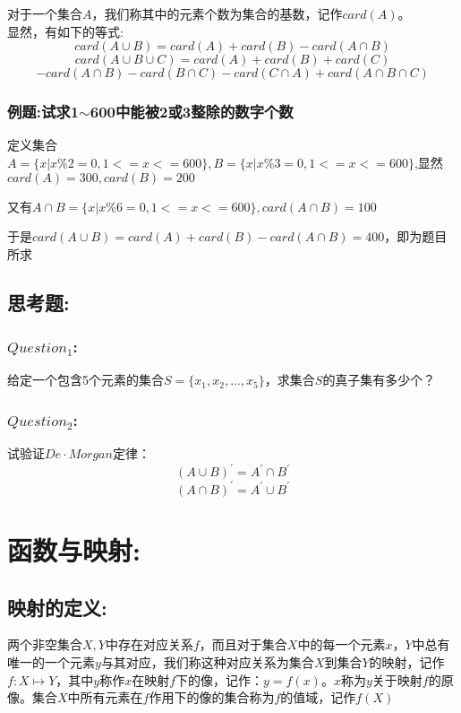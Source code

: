 \documentclass[UTF8]{article}
\begin{document}
对于一个集合$A$，我们称其中的元素个数为集合的基数，记作$card(A)$。\\

显然，有如下的等式:
$$card(A \cup B) = card(A) + card(B) - card(A \cap B)$$
$$card(A \cup B \cup C) = card(A) + card(B) + card(C) $$
$$- card(A \cap B) - card(B \cap C) - card(C \cap A) + card(A \cap B \cap C)$$

\subsubsection{例题:试求1$\sim$600中能被2或3整除的数字个数}

定义集合$A = \{x|x\%2 = 0, 1 <= x <= 600\}, B = \{x|x\%3 = 0, 1 <= x <= 600\}$,显然$card(A) = 300, card(B) = 200$

又有$A \cap B = \{x|x\%6 = 0, 1 <= x <= 600\}, card(A\cap B) = 100$

于是$card(A\cup B) = card(A) + card(B) - card(A\cap B) = 400$，即为题目所求

\subsection{思考题:}

\subsubsection{$Question_1$:}

给定一个包含5个元素的集合$S = \{x_1, x_2, ... , x_5\}$，求集合$S$的真子集有多少个？

\subsubsection{$Question_2$:}

试验证$De\cdot Morgan$定律：
$$(A \cup B)^{'} = A^{'} \cap B^{'}$$
$$(A \cap B)^{'} = A^{'} \cup B^{'}$$

\section{函数与映射:}

\subsection{映射的定义:}

两个非空集合$X, Y$中存在对应关系$f$，而且对于集合$X$中的每一个元素$x$，$Y$中总有唯一的一个元素$y$与其对应，我们称这种对应关系为集合$X$到集合$Y$的映射，记作$f: X \mapsto Y$，其中$y$称作$x$在映射$f$下的像，记作：$y = f(x)$。$x$称为$y$关于映射$f$的原像。集合$X$中所有元素在$f$作用下的像的集合称为$f$的值域，记作$f(X)$\\
\end{document}
